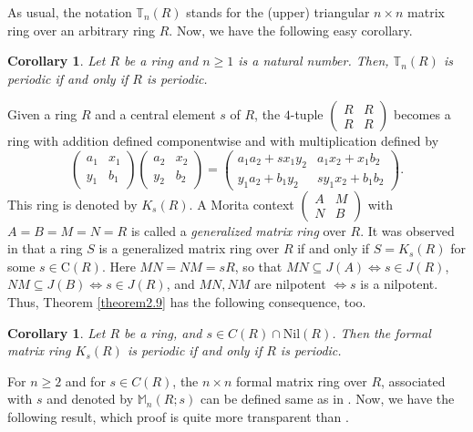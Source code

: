 \documentclass[12pt]{amsart}
\newtheorem{cor}[thm]{Corollary}
\theoremstyle{definition}
\theoremstyle{remark}
\numberwithin{equation}{section}
\begin{document}
As usual, the notation $\mathbb{T}_n(R)$ stands for the (upper) triangular $n\times n$ matrix ring over an arbitrary ring $R$. Now, we have the following easy corollary.

\begin{cor}
Let $R$ be a ring and $n\geq 1$ is a natural number. Then, $\mathbb{T}_n(R)$ is periodic if and only if $R$ is  periodic.
\end{cor}

Given a ring $R$ and a central element $s$ of $R$, the $4$-tuple $\begin{pmatrix} R & R \\ R & R \end{pmatrix}$ becomes a ring with addition defined componentwise and with multiplication defined by
\[\begin{pmatrix} a_1 & x_1 \\ y_1 & b_1 \end{pmatrix} \begin{pmatrix} a_2 & x_2 \\ y_2 & b_2 \end{pmatrix} =
\begin{pmatrix} a_1a_2+sx_1y_2 & a_1x_2+x_1b_2 \\ y_1a_2+b_1y_2 & sy_1x_2+b_1b_2 \end{pmatrix}. \]
This ring is denoted by $K_s(R)$. A Morita context $\begin{pmatrix} A & M \\ N & B \end{pmatrix}$ with $A=B=M=N=R$ is called a {\it generalized matrix ring} over $R$. It was observed in \cite{KrylovGMR} that a ring $S$ is a generalized matrix ring over $R$ if and only if $S=K_s(R)$ for some $s\in \mathrm{C}(R)$. Here $MN=NM=sR$, so that $MN \subseteq J(A) \Leftrightarrow s \in J(R)$, $NM \subseteq J(B) \Leftrightarrow s \in J(R)$, and $MN,NM$ are nilpotent $\Leftrightarrow s$ is a nilpotent. Thus, Theorem \ref{theorem2.9} has the following consequence, too.

\begin{cor}\label{corollary2.10}
Let $R$ be a ring, and $s \in C(R) \cap \mathrm{Nil}(R)$. Then the formal matrix ring $K_s(R)$ is periodic if and only if $R$ is periodic.
\end{cor}

For $n \geq 2$ and for $s\in C(R)$, the $n \times n$ formal matrix ring over $R$, associated with $s$ and denoted by $\mathbb{M}_n(R;s)$ can be defined same as in \cite{TZ}. Now, we have the following result, which proof is quite more transparent than \cite[Corollary 10.1.17]{CS}.
\end{document}
